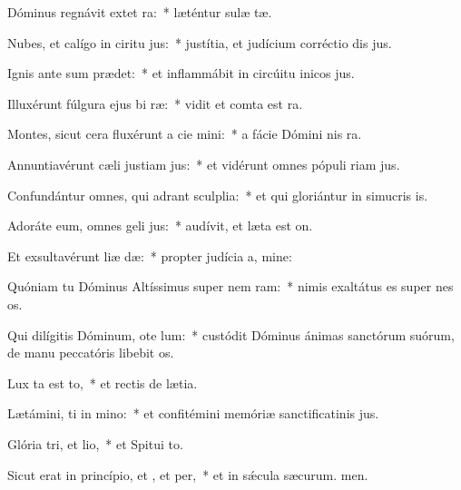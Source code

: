 \item Dóminus regnávit extet ra:~* læténtur sulæ tæ.
\item Nubes, et calígo in ciritu jus:~* justítia, et judícium corréctio dis jus.
\item Ignis ante sum prædet:~* et inflammábit in circúitu inicos jus.
\item Illuxérunt fúlgura ejus bi ræ:~* vidit et comta est ra.
\item Montes, sicut cera fluxérunt a cie mini:~* a fácie Dómini nis ra.
\item Annuntiavérunt cæli justiam jus:~* et vidérunt omnes pópuli riam jus.
\item Confundántur omnes, qui adrant sculplia:~* et qui gloriántur in simucris is.
\item Adoráte eum, omnes geli jus:~* audívit, et læta est on.
\item Et exsultavérunt liæ dæ:~* propter judícia a, mine:
\item Quóniam tu Dóminus Altíssimus super nem ram:~* nimis exaltátus es super nes os.
\item Qui dilígitis Dóminum, ote lum:~* custódit Dóminus ánimas sanctórum suórum, de manu peccatóris libebit os.
\item Lux ta est to,~* et rectis de lætia.
\item Lætámini, ti in mino:~* et confitémini memóriæ sanctificatinis jus.
\item Glória tri, et lio,~* et Spitui to.
\item Sicut erat in princípio, et , et per,~* et in sǽcula sæcurum. men.
